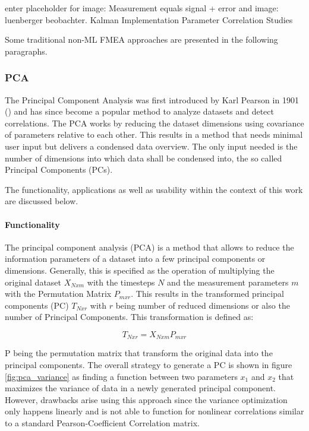 enter placeholder for image: Measurement equals signal + error and image: luenberger beobachter. Kalman Implementation \cite{lie_synthetic_2013}
Parameter Correlation Studies  \cite{li_simple_2015}

Some traditional non-ML FMEA approaches are presented in the following paragraphs.

\subsubsection{PCA}

The Principal Component Analysis was first introduced by Karl Pearson in 1901 (\cite{pearson_liii_1901}) and has since become a popular method to analyze datasets and detect correlations. The PCA works by reducing the dataset dimensions using covariance of parameters relative to each other. This results in a method that needs minimal user input but delivers a condensed data overview. The only input needed is the number of dimensions into which data shall be condensed into, the so called Principal Components (PCs).

The functionality, applications as well as usability within the context of this work are discussed below.

\paragraph{Functionality}
The principal component analysis (PCA) is a method that allows to reduce the information parameters of a dataset into a few principal components or dimensions. Generally, this is specified as the operation of multiplying the original dataset $X_{Nxm}$ with the timesteps $N$ and the measurement parameters $m$ with the Permutation Matrix $P_{mxr}$. This results in the transformed principal components (PC) $T_{Nxr}$ with $r$ being number of reduced dimensions or also the number of Principal Components. This transformation is defined as:

$$T_{Nxr} = X_{Nxm}  P_{mxr}$$

P being the permutation matrix that transform the original data into the principal components. The overall strategy to generate a PC is shown in figure \ref{fig:pca_variance} as finding a function between two parameters $x_1$ and $x_2$ that maximizes the variance of data in a newly generated principal component. However, drawbacks arise using this approach since the variance optimization only happens linearly and is not able to function for nonlinear correlations similar to a standard Pearson-Coefficient Correlation matrix. \cite{handl_multivariate_2017}

